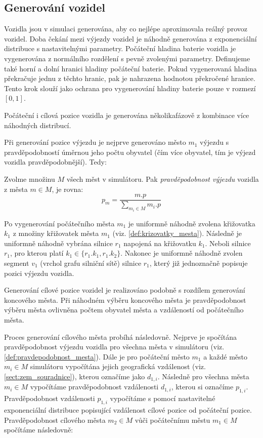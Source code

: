 \subsection{Generování vozidel}
\label{subsec:generovani_vozidel}

Vozidla jsou v simulaci generována, aby co nejlépe aproximovala reálný provoz
vozidel. Doba čekání mezi výjezdy vozidel je náhodně generována z exponenciální
distribuce s nastavitelnými parametry. Počáteční hladina baterie vozidla je 
vygenerována z normálního rozdělení s pevně zvolenými parametry. Definujeme
také horní a dolní hranici hladiny počáteční baterie. Pokud vygenerovaná
hladina překračuje jednu z těchto hranic, pak je nahrazena hodnotou
překročené hranice.
Tento krok slouží jako ochrana pro vygenerování hladiny baterie pouze
v rozmezí $[0, 1]$.


Počáteční i cílová pozice vozidla je generována několikafázově z kombinace 
více náhodných distribucí. 

Při generování pozice výjezdu je nejprve generováno město $m_1$ výjezdu s 
pravděpodobností úměrnou jeho počtu obyvatel (čím více obyvatel, tím je 
výjezd vozidla pravděpodobnější). Tedy:

\begin{defn}\label{def:pravdepodobnost_mesta}
    Zvolme množinu $M$ všech měst v simulátoru. Pak 
    \emph{pravděpodobnost výjezdu} vozidla z města $m \in M$, je rovna:
        $$p_m = \frac{m.p}{\sum_{m_i \in M} m_i.p}$$
\end{defn}

Po vygenerování počátečního města $m_1$ je uniformně náhodně zvolena 
křižovatka $k_1$ z množiny křižovatek města $m_1$ 
(viz. \cref{def:krizovatky_mesta}). Následně je uniformně náhodně vybrána
silnice $r_1$ napojená na křižovatku $k_1$. Neboli silnice $r_1$, pro kterou
platí $ k_1 \in \{r_1.k_1, r_1.k_2\}$. Nakonec je uniformně náhodně zvolen
segment $v_1$ (vrchol grafu silniční sítě) silnice $r_1$, který již jednoznačně
popisuje pozici výjezdu vozidla. 

Generování cílové pozice vozidel je realizováno podobně s rozdílem generování 
koncového města. Při náhodném výběru koncového města je pravděpodobnost
výběru města ovlivněna počtem obyvatel města a vzdáleností od počátečního města.

Proces generování cílového města probíhá následovně. Nejprve je spočítána 
pravděpodobnost výjezdu vozidla pro všechna města v simulátoru 
(viz. \cref{def:pravdepodobnost_mesta}). Dále je pro počáteční město $m_1$
a každé město $m_i \in M$ simulátoru vypočítána jejich geografická vzdálenost
(viz. \cref{sect:zem_souradnice}), kterou označíme jako $d_{1,i}$. 
Následně pro všechna města $m_i \in M$ vypočítáme pravděpodobnost vzdálenosti $d_{1,i}$,
kterou si označíme $p_{1,i}$. Pravděpodobnost vzdálenosti $p_{1,i}$ vypočítáme
s pomocí nastavitelné exponenciální distribuce popisující vzdálenost cílové
pozice od počáteční pozice. Pravděpodobnost cílového města $m_2 \in M$
vůči počátečnímu městu $m_1 \in M$ spočítáme následovně:

